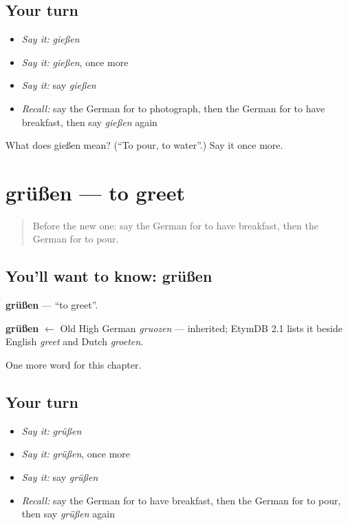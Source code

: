 \subsection*{Your turn}
\begin{itemize}
\raggedright
  \item \emph{Say it:} \emph{gießen}
  \item \emph{Say it:} \emph{gießen}, once more
  \item \emph{Say it:} say \emph{gießen}
  \item \emph{Recall:} say the German for to photograph, then the German for to have breakfast, then say \emph{gießen} again
\end{itemize}

\begin{tcolorbox}[breakable,colback=teal!4,colframe=teal!35!black,title={Before you move on}]
What does gießen mean? (\textquotedblleft{}To pour, to water\textquotedblright{}.) Say it once more.
\end{tcolorbox}
\section[grüßen]{grüßen — to greet}

\label{lesson:GE-C181-gruessen}



\begin{quote}
Before the new one: say the German for to have breakfast, then the German for to pour.
\end{quote}

\subsection*{You'll want to know: grüßen}
\textbf{grüßen} — \textquotedblleft{}to greet\textquotedblright{}.

\begin{cousinweb}
\textbf{grüßen} $\leftarrow$ Old High German \emph{gruozen} — inherited; EtymDB 2.1 lists it beside English \emph{greet} and Dutch \emph{groeten}.
\end{cousinweb}

\begin{grammarlens}[title={What you've built}]
One more word for this chapter.
\end{grammarlens}

\subsection*{Your turn}
\begin{itemize}
\raggedright
  \item \emph{Say it:} \emph{grüßen}
  \item \emph{Say it:} \emph{grüßen}, once more
  \item \emph{Say it:} say \emph{grüßen}
  \item \emph{Recall:} say the German for to have breakfast, then the German for to pour, then say \emph{grüßen} again
\end{itemize}

